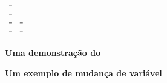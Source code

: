 \documentclass[oneside,12pt]{article}
\begin{document}
\msk

$\scalebox{0.55}{$
   \begin{array}{l}
   \ga{[MV1]} \;=\; \ga{(MV1)} \\ \\[-5pt]
   \ga{[MV2]} \;=\; \ga{(MV2)} \\ \\[-5pt]
   \ga{[MV3]} \;=\; \ga{(MV3)}
    \quad
     \ga{[MV4]} \;=\; \ga{(MV4)} \\ \\[-5pt]
   \ga{[MVI3]} \;=\; \ga{(MVI3)}
    \quad
     \ga{[MVI4]} \;=\; \ga{(MVI4)} \\ \\[-5pt]
   \end{array}
 $}
$


\newpage

{\bf Uma demonstração do \ga{[MV1]}}




\newpage


{\bf Um exemplo de mudança de variável}

\def\P  #1{\left(    #1 \right)}
\def\Pga#1{\left(\ga{#1}\right)}
\end{document}

